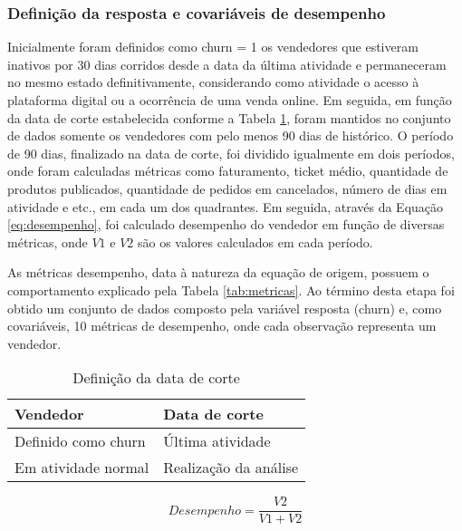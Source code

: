 \documentclass[twocolumn]{rbef}
\newcommand{\1}{\mathbbm{1}}
\begin{document}
\hypertarget{definiuxe7uxe3o-da-resposta-e-covariuxe1veis-de-desempenho}{%
\subsubsection{Definição da resposta e covariáveis de desempenho}\label{definiuxe7uxe3o-da-resposta-e-covariuxe1veis-de-desempenho}}

Inicialmente foram definidos como churn = 1 os vendedores que estiveram inativos por 30 dias corridos desde a data da última atividade e permaneceram no mesmo estado definitivamente, considerando como atividade o acesso à plataforma digital ou a ocorrência de uma venda online. Em seguida, em função da data de corte estabelecida conforme a Tabela \ref{tab:dataDeCorte}, foram mantidos no conjunto de dados somente os vendedores com pelo menos 90 dias de histórico. O período de 90 dias, finalizado na data de corte, foi dividido igualmente em dois períodos, onde foram calculadas métricas como faturamento, ticket médio, quantidade de produtos publicados, quantidade de pedidos em cancelados, número de dias em atividade e etc., em cada um dos quadrantes. Em seguida, através da Equação \eqref{eq:desempenho}, foi calculado desempenho do vendedor em função de diversas métricas, onde \(V1\) e \(V2\) são os valores calculados em cada período.

As métricas desempenho, data à natureza da equação de origem, possuem o comportamento explicado pela Tabela \ref{tab:metricas}. Ao término desta etapa foi obtido um conjunto de dados composto pela variável resposta (churn) e, como covariáveis, 10 métricas de desempenho, onde cada observação representa um vendedor.

\begin{table}

\caption{\label{tab:dataDeCorte}Definição da data de corte}
\centering
\fontsize{8}{10}\selectfont
\begin{tabular}[t]{ll}
\toprule
Vendedor & Data de corte\\
\midrule
Definido como churn & Última atividade\\
Em atividade normal & Realização da análise\\
\bottomrule
\end{tabular}
\end{table}

\begin{equation}
Desempenho = \dfrac{V2}{V1+V2} \label{eq:desempenho}
\end{equation}
\end{document}
